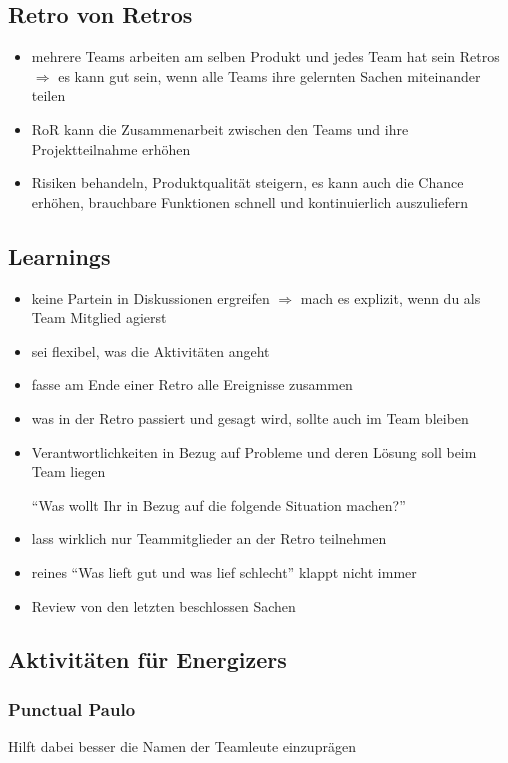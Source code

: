 \subsection{Retro von Retros}

\begin{itemize}
  \item mehrere Teams arbeiten am selben Produkt und jedes Team hat sein Retros $\Rightarrow$  es
  kann gut sein, wenn alle Teams ihre gelernten Sachen miteinander teilen
  \item RoR kann die Zusammenarbeit zwischen den Teams und ihre Projektteilnahme erhöhen
  \item Risiken behandeln, Produktqualität steigern, es kann auch die Chance erhöhen, brauchbare
    Funktionen schnell und kontinuierlich auszuliefern
\end{itemize}


\subsection{Learnings}
\begin{itemize}
  \item keine Partein in Diskussionen ergreifen $\Rightarrow$  mach es explizit, wenn du als
    Team Mitglied agierst
  \item sei flexibel, was die Aktivitäten angeht
  \item fasse am Ende einer Retro alle Ereignisse zusammen
  \item was in der Retro passiert und gesagt wird, sollte auch im Team bleiben
  \item Verantwortlichkeiten in Bezug auf Probleme und deren Lösung soll beim Team liegen

    \enquote{Was wollt Ihr in Bezug auf die folgende Situation machen?}
  \item lass wirklich nur Teammitglieder an der Retro teilnehmen
  \item reines \enquote{Was lieft gut und was lief schlecht} klappt nicht immer
  \item Review von den letzten beschlossen Sachen
\end{itemize}


\subsection{Aktivitäten für Energizers}
\subsubsection{Punctual Paulo}
Hilft dabei besser die Namen der Teamleute einzuprägen

